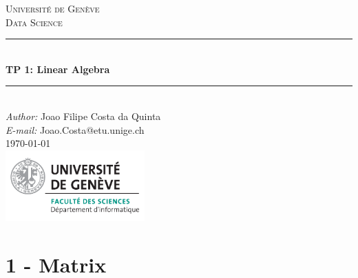 \documentclass[a4paper]{article}
\makeatletter
\newcommand\TPid{1}
\newcommand\TPname{Linear Algebra}
\newcommand\Firstname{Joao Filipe}
\newcommand\Familyname{Costa da Quinta}
\newcommand\Email{Joao.Costa@etu.unige.ch}
\makeatother
\begin{document}
\begin{titlepage}

\newcommand{\HRule}{\rule{\linewidth}{0.5mm}} 							%

\center 
 
\textsc{\LARGE Université de Genève}\\[1cm]

\textsc{\Large Data Science}\\[0.2cm]									%
\HRule \\[0.8cm]
{ \huge \bfseries TP \TPid : \TPname}\\[0.7cm]								%
\HRule \\[2cm]
\large
\emph{Author:} \Firstname \; \Familyname\\[0.5cm]		
\emph{E-mail:} {\color{blue}\Email}\\[7cm]		
{\large \today}\\[2cm]
\includegraphics[width=0.4\textwidth]{images/unige_csd.png}\\[1cm] 	%
\vfill 
\end{titlepage}


\newpage
\section*{1 - Matrix}
\end{document}
